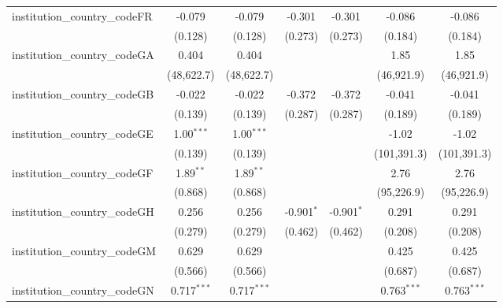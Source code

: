 \begin{tabular}{lcccccc}
   institution\_country\_codeFR          & -0.079         & -0.079         & -0.301         & -0.301         & -0.086         & -0.086\\   
                                         & (0.128)        & (0.128)        & (0.273)        & (0.273)        & (0.184)        & (0.184)\\   
   institution\_country\_codeGA          & 0.404          & 0.404          &                &                & 1.85           & 1.85\\   
                                         & (48,622.7)     & (48,622.7)     &                &                & (46,921.9)     & (46,921.9)\\   
   institution\_country\_codeGB          & -0.022         & -0.022         & -0.372         & -0.372         & -0.041         & -0.041\\   
                                         & (0.139)        & (0.139)        & (0.287)        & (0.287)        & (0.189)        & (0.189)\\   
   institution\_country\_codeGE          & 1.00$^{***}$   & 1.00$^{***}$   &                &                & -1.02          & -1.02\\   
                                         & (0.139)        & (0.139)        &                &                & (101,391.3)    & (101,391.3)\\   
   institution\_country\_codeGF          & 1.89$^{**}$    & 1.89$^{**}$    &                &                & 2.76           & 2.76\\   
                                         & (0.868)        & (0.868)        &                &                & (95,226.9)     & (95,226.9)\\   
   institution\_country\_codeGH          & 0.256          & 0.256          & -0.901$^{*}$   & -0.901$^{*}$   & 0.291          & 0.291\\   
                                         & (0.279)        & (0.279)        & (0.462)        & (0.462)        & (0.208)        & (0.208)\\   
   institution\_country\_codeGM          & 0.629          & 0.629          &                &                & 0.425          & 0.425\\   
                                         & (0.566)        & (0.566)        &                &                & (0.687)        & (0.687)\\   
   institution\_country\_codeGN          & 0.717$^{***}$  & 0.717$^{***}$  &                &                & 0.763$^{***}$  & 0.763$^{***}$\\   

\end{tabular}
